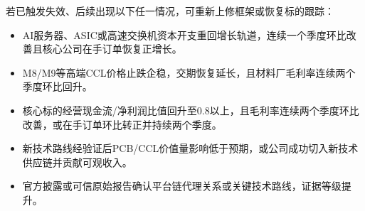 \begin{keyinsight}
若已触发失效、后续出现以下任一情况，可重新上修框架或恢复标的跟踪：
\begin{itemize}
  \item AI服务器、ASIC或高速交换机资本开支重回增长轨道，连续一个季度环比改善且核心公司在手订单恢复正增长。
  \item M8/M9等高端CCL价格止跌企稳，交期恢复延长，且材料厂毛利率连续两个季度环比回升。
  \item 核心标的经营现金流/净利润比值回升至0.8以上，且毛利率连续两个季度环比改善，或在手订单环比转正并持续两个季度。
  \item 新技术路线经验证后PCB/CCL价值量影响低于预期，或公司成功切入新技术供应链并贡献可观收入。
  \item 官方披露或可信原始报告确认平台链代理关系或关键技术路线，证据等级提升。
\end{itemize}
\end{keyinsight}
